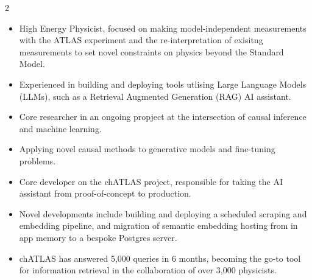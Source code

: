\documentclass[10pt,a4paper,ragged2e,withhyper,normalphoto]{config/altacv}
\begin{document}



\makecvheader
\begin{paracol}{2}

\begin{itemize}
\item High Energy Physicist, focused on making model-independent measurements with the ATLAS experiment and the re-interpretation of exisitng measurements to set novel constraints on physics beyond the Standard Model.
\item Experienced in building and deploying tools utlising Large Language Models (LLMs), such as a Retrieval Augmented Generation (RAG) AI assistant.
\end{itemize}


\begin{itemize}
  \item Core researcher in an ongoing propject at the intersection of causal inference and machine learning.
  \item Applying novel causal methods to generative models and fine-tuning problems.
\end{itemize}

\begin{itemize}
\item Core developer on the chATLAS project, responsible for taking the AI assistant from proof-of-concept to production.
\item Novel developments include building and deploying a scheduled scraping and embedding pipeline, and migration of semantic embedding hosting from in app memory to a bespoke Postgres server.
\item chATLAS has answered 5,000 queries in 6 months, becoming the go-to tool for information retrieval in the collaboration of over 3,000 physicists.
\end{itemize}


\end{paracol}
\end{document}
